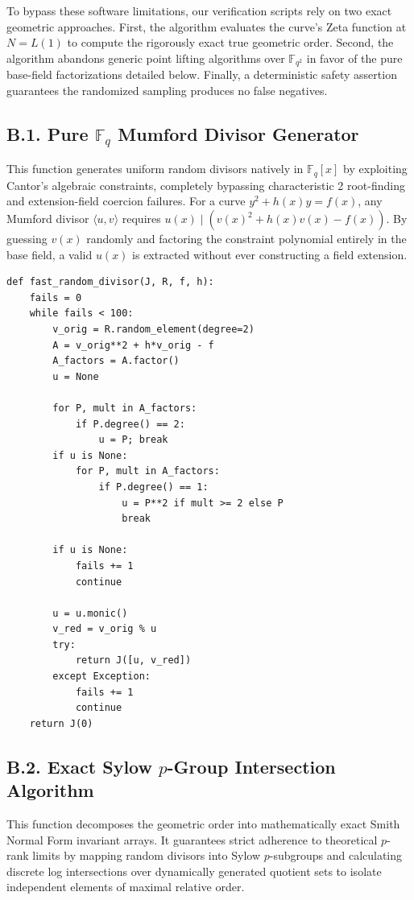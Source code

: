 \documentclass[letterpaper, 11pt]{article}
\begin{document}
To bypass these software limitations, our verification scripts rely on two exact geometric approaches. First, the algorithm evaluates the curve's Zeta function at $N = L(1)$ to compute the rigorously exact true geometric order. Second, the algorithm abandons generic point lifting algorithms over $\mathbb{F}_{q^2}$ in favor of the pure base-field factorizations detailed below. Finally, a deterministic safety assertion guarantees the randomized sampling produces no false negatives.

\subsection{B.1. Pure \texorpdfstring{$\mathbb{F}_q$}{F\_q} Mumford Divisor Generator}
This function generates uniform random divisors natively in $\mathbb{F}_q[x]$ by exploiting Cantor's algebraic constraints, completely bypassing characteristic 2 root-finding and extension-field coercion failures. For a curve $y^2+h(x)y=f(x)$, any Mumford divisor $\langle u, v \rangle$ requires $u(x) \mid (v(x)^2 + h(x)v(x) - f(x))$. By guessing $v(x)$ randomly and factoring the constraint polynomial entirely in the base field, a valid $u(x)$ is extracted without ever constructing a field extension.

\begin{lstlisting}
def fast_random_divisor(J, R, f, h):
    fails = 0
    while fails < 100:
        v_orig = R.random_element(degree=2)
        A = v_orig**2 + h*v_orig - f
        A_factors = A.factor()
        u = None
        
        for P, mult in A_factors:
            if P.degree() == 2:
                u = P; break
        if u is None:
            for P, mult in A_factors:
                if P.degree() == 1:
                    u = P**2 if mult >= 2 else P
                    break
                    
        if u is None:
            fails += 1
            continue
            
        u = u.monic()
        v_red = v_orig % u
        try:
            return J([u, v_red])
        except Exception:
            fails += 1
            continue
    return J(0) 
\end{lstlisting}

\subsection{B.2. Exact Sylow \texorpdfstring{$p$}{p}-Group Intersection Algorithm}
This function decomposes the geometric order into mathematically exact Smith Normal Form invariant arrays. It guarantees strict adherence to theoretical $p$-rank limits by mapping random divisors into Sylow $p$-subgroups and calculating discrete log intersections over dynamically generated quotient sets to isolate independent elements of maximal relative order.
\end{document}

